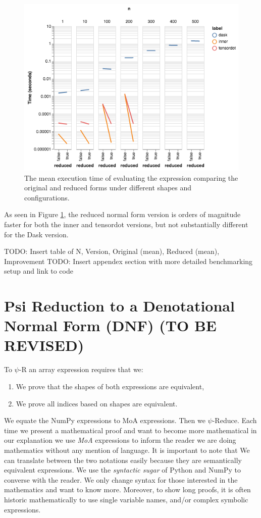 \documentclass[a4paper,12pt]{article}
\begin{document}
\begin{figure}[h]
  \includegraphics[width=1\textwidth]{benchmarks/visualization.png}
  \caption{The mean execution time of evaluating the expression comparing the original and reduced forms under different shapes and configurations.}
  \label{fig:plot}
\end{figure}

As seen in Figure \ref{fig:plot}, the reduced normal form version is orders of magnitude faster for both the inner and tensordot versions, but not substantially different for the Dask version. 

TODO: Insert table of N, Version, Original (mean), Reduced (mean), Improvement
TODO: Insert appendex section with more detailed benchmarking setup and link to code


\section{Psi Reduction to a Denotational Normal Form (DNF) (TO BE REVISED)}
To $\psi$-R an array expression requires that we:
\begin{enumerate}
    \item We  prove that the shapes of both expressions are equivalent,
    \item We prove all indices based on shapes are equivalent.
\end{enumerate}


We equate the NumPy expressions to MoA expressions. Then we $\psi$-Reduce.
Each time we present a mathematical proof and want to become more mathematical in our explanation we use  {\em MoA} expressions to inform the reader we are doing mathematics without any mention of language. It is important to note that We can translate between the two notations easily  because they are semantically equivalent expressions. We use the {\em syntactic sugar} of Python and NumPy to  converse with the reader. We only change syntax for those interested in the mathematics and want to know more. Moreover, to show long proofs, it is often historic mathematically to use single variable names, and/or complex symbolic expressions.
\end{document}
